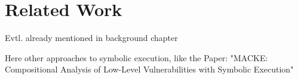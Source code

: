 \chapter{Related Work}

Evtl. already mentioned in background chapter

Here other approaches to symbolic execution, like the Paper: "MACKE: Compositional Analysis of Low-Level Vulnerabilities with Symbolic Execution"
